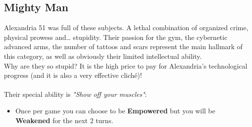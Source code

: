 \subsection{Mighty Man}


Alexandria 51 was full of these subjects. A lethal combination of organized crime, physical prowess and… stupidity. Their passion for the gym, the cybernetic advanced arms, the number of tattoos and scars represent the main hallmark of this category, as well as obviously their limited intellectual ability.\\
Why are they so stupid? It is the high price to pay for Alexandria's technological progress (and it is also a very effective cliché)!\\\\

Their special ability is \textit{"Show off your muscles"}:
\begin{itemize}
\item Once per game you can choose to be \textbf{Empowered} but you will be \textbf{Weakened} for the next 2 turns.
\end{itemize}
